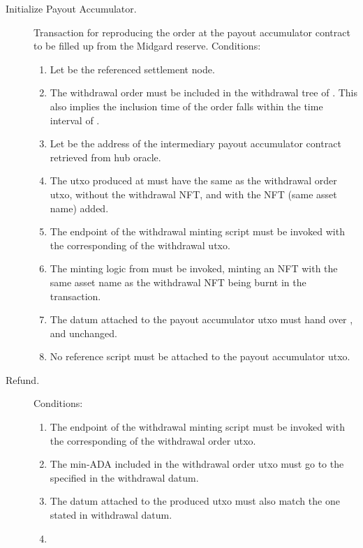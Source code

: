 \documentclass[../midgard.tex]{subfiles}
\begin{document}
\begin{description}
  \item[Initialize Payout Accumulator.] Transaction for reproducing the order at the payout accumulator contract to be filled up from the Midgard reserve.
    Conditions:
    \begin{enumerate}
      \item Let  be the referenced settlement node.
      \item The withdrawal order must be included in the withdrawal tree of .
        This also implies the inclusion time of the order falls within the time interval of .
      \item Let  be the address of the intermediary payout accumulator contract retrieved from hub oracle.
      \item The utxo produced at  must have the same  as the withdrawal order utxo, without the withdrawal NFT, and with the  NFT (same asset name) added.
      \item The  endpoint of the withdrawal minting script must be invoked with the corresponding  of the withdrawal utxo.
      \item The minting logic from  must be invoked, minting an NFT with the same asset name as the withdrawal NFT being burnt in the transaction.
      \item The datum attached to the payout accumulator utxo must hand over ,  and  unchanged.
      \item No reference script must be attached to the payout accumulator utxo.
    \end{enumerate}
  \item[Refund.] 
    Conditions:
    \begin{enumerate}
      \item The  endpoint of the withdrawal minting script must be invoked with the corresponding  of the withdrawal order utxo.
      \item The min-ADA included in the withdrawal order utxo must go to the  specified in the withdrawal datum.
      \item The datum attached to the produced utxo must also match the one stated in withdrawal datum.
      \item 

\end{enumerate}
\end{description}
\end{document}

